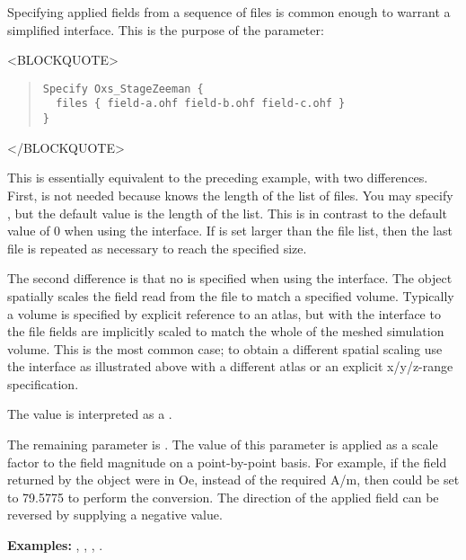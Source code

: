\begin{itemize}
\begin{description}
   Specifying applied fields from a sequence of files is common enough
   to warrant a simplified interface.  This is the purpose of the
    parameter:
\begin{rawhtml}<BLOCKQUOTE>\end{rawhtml}
\begin{quote}
\begin{verbatim}
Specify Oxs_StageZeeman {
  files { field-a.ohf field-b.ohf field-c.ohf }
}
\end{verbatim}
\end{quote}
\begin{rawhtml}</BLOCKQUOTE>\end{rawhtml}
   This is essentially equivalent to the preceding example, with two
   differences.  First,  is not needed because
    knows the length of the list of files.  You may
   specify , but the default value is the length of the
    list.  This is in contrast to the default value
   of 0 when using the  interface.  If  is
   set larger than the file list, then the last file is repeated as
   necessary to reach the specified size.

   The second difference is that no  is specified when
   using the  interface.  The  object
   spatially scales the field read from the file to match a specified
   volume.  Typically a volume is specified by explicit reference to an
   atlas, but with the  interface to  the
   file fields are implicitly scaled to match the whole of the meshed
   simulation volume.  This is the most common case; to obtain a
   different spatial scaling use the  interface as
   illustrated above with a different atlas or an explicit x/y/z-range
   specification.

   The  value is interpreted as a
   .  

   The remaining  parameter is
   .  The value of this parameter is applied as a
   scale factor to the field magnitude on a point-by-point basis.  For
   example, if the field returned by the  object
   were in Oe, instead of the required A/m, then  could
   be set to 79.5775 to perform the conversion.  The direction of the
   applied field can be reversed by supplying a negative 
   value.

   \begin{sloppypar}
   \raggedright
   \textbf{Examples:} , ,
                      , .
   \end{sloppypar}

\end{description}
\end{itemize}

